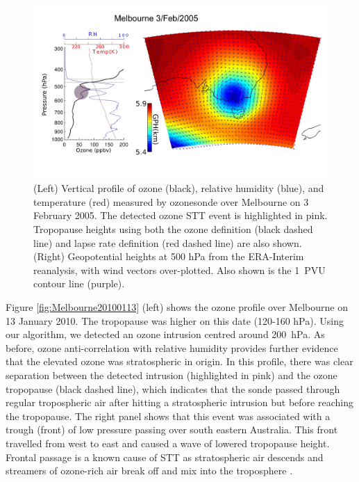     \begin{figure}[t]
      \includegraphics[width=14.0cm]{figures/Melbourne20050203.png}
      \caption{(Left) Vertical profile of ozone (black), relative humidity (blue), and temperature (red) measured by ozonesonde over Melbourne on 3 February 2005.
      The detected ozone STT event is highlighted in pink.
      Tropopause heights using both the ozone definition (black dashed line) and lapse rate definition (red dashed line) are also shown.
      (Right) Geopotential heights at 500 hPa from the ERA-Interim reanalysis, with wind vectors over-plotted.
      Also shown is the 1~PVU contour line (purple).}
      \label{fig:Melbourne20050203}
    \end{figure}
    
    Figure \ref{fig:Melbourne20100113} (left) shows the ozone profile over Melbourne on 13 January 2010.
    The tropopause was higher on this date (120-160 hPa).
    Using our algorithm, we detected an ozone intrusion centred around 200~hPa.
    As before, ozone anti-correlation with relative humidity provides further evidence that the elevated ozone was stratospheric in origin.
    In this profile, there was clear separation between the detected intrusion (highlighted in pink) and the ozone tropopause (black dashed line), which indicates that the sonde passed through regular tropospheric air after hitting a stratospheric intrusion but before reaching the tropopause.
    The right panel shows that this event was associated with a trough (front) of low pressure passing over south eastern Australia.
    This front travelled from west to east and caused a wave of lowered tropopause height. 
    Frontal passage is a known cause of STT as stratospheric air descends and streamers of ozone-rich air break off and mix into the troposphere \citep{Sprenger2003}.
    
